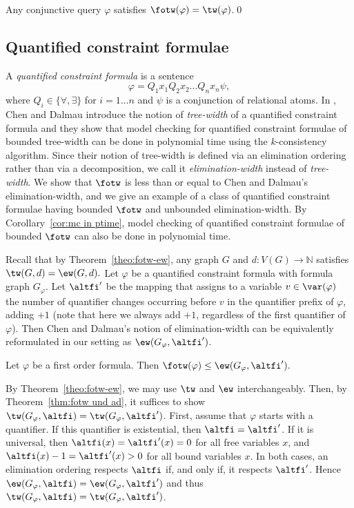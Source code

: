 \documentclass{LMCS}
\newcommand{\gfi}{G_{\varphi}}
\renewcommand{\phi}{\varphi}
\begin{document}
\begin{rem}\label{rem:CQs}
Any conjunctive query $\phi$ satisfies $\fotw(\phi)=\tw(\phi)$.\qed
\end{rem}



\subsection{Quantified constraint formulae}

A \emph{quantified constraint formula} \cite{chedal05} is a sentence
\[
\phi=Q_1 x_1Q_2 x_2\ldots Q_nx_n\psi,
\]
where $Q_i\in\{\forall,\exists\}$ for $i=1\ldots n$ and 
$\psi$ is a conjunction of relational atoms.
In \cite{chedal05}, Chen and Dalmau introduce the notion of \emph{tree-width}
of a quantified constraint formula and they show that model checking
for quantified constraint formulae of bounded tree-width can be done in polynomial 
time using the $k$-consistency algorithm. Since their notion of tree-width
is defined via an elimination ordering rather than via a decomposition, 
we call it \emph{elimination-width}
instead of \emph{tree-width}. 
We show that $\fotw$ is less than or equal to Chen and Dalmau's elimination-width,
and we give an example of a class of quantified constraint formulae 
having bounded $\fotw$ and unbounded elimination-width.
By Corollary~\ref{cor:mc in ptime}, 
model checking of quantified constraint formulae of bounded $\fotw$ 
can also be done in polynomial time. 

Recall that by Theorem~\ref{theo:fotw-ew}, any graph $G$ and
$d:V(G)\to\mathbb N$ satisfies $\tw(G,d)=\ew(G,d).$
Let $\varphi$ be a quantified constraint formula with formula graph $\gfi$. 
Let $\altfi'$ be the mapping that assigns to a variable $v\in\var(\varphi)$ the
number of quantifier changes occurring before $v$ in the
quantifier prefix of $\varphi$, adding $+1$ 
(note that here we always add $+1$, 
regardless of the first quantifier of $\phi$). 
Then Chen and Dalmau's notion of
elimination-width can be equivalently 
reformulated in our setting as $\ew(\gfi,\altfi')$.  

\begin{lem}\label{lem:fotw <= CDw}
	Let $\varphi$ be a first order  formula. Then 
$
 	\fotw(\varphi) \leq \ew(\gfi,\altfi'). 
$
\end{lem}

\proof 
By Theorem~\ref{theo:fotw-ew}, we may use $\tw$ and $\ew$ interchangeably. 
Then, by Theorem~\ref{thm:fotw und ad}, 
it suffices to show $\tw(\gfi,\altfi)=\tw(\gfi,\altfi')$. 
First, assume that $\phi$ starts with a quantifier. 
If this quantifier is existential, then $\altfi=\altfi'$. 
If it is universal, then $\altfi(x)=\altfi'(x)=0$ for all free variables $x$, 
and $\altfi(x)-1=\altfi'(x)>0$ for all bound variables $x$. 
In both cases, an elimination ordering respects $\altfi$ 
if, and only if, it respects $\altfi'$. 
Hence $\ew(\gfi,\altfi)=\ew(\gfi,\altfi')$ 
and thus $\tw(\gfi,\altfi)=\tw(\gfi,\altfi')$. 
\end{document}
